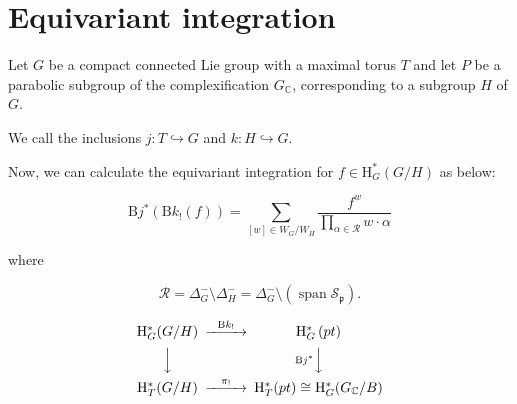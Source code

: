 \documentclass[uplatex,dvipdfmx]{jsarticle}
\begin{document}
\section{Equivariant integration}

Let 
$G$ 
be a compact connected Lie group with a maximal torus
$T$
and let
$P$
be a parabolic subgroup of the complexification 
$G_{\mathbb{C}}$,
corresponding to a subgroup
$H$
of
$G$.

We call the inclusions
$j \colon T \hookrightarrow G$
and
$k \colon H \hookrightarrow G$.

Now, we can calculate the equivariant integration for 
$f \in \mathrm{H}^*_G(G/H)$ 
as below:

\begin{equation}
    \mathrm{B}j^*\left( 
        \mathrm{B}k_! \left( 
            f
        \right)
    \right)
    =
    \sum_{
        [w] \in W_G / W_H
    }
    \frac{f^w}{\prod_{\alpha \in \mathcal{R}} w \cdot \alpha}
\end{equation}

where

\begin{equation}
    \mathcal{R}
    =
    \Delta_G^- \setminus \Delta_H^-
    =
    \Delta_G^- \setminus (\operatorname{span} \mathcal{S}_\mathfrak{p}).
\end{equation}

\begin{equation}
    \begin{CD}
        \mathrm{H}^*_G(G/H) @>{\mathrm{B}k_!}>> \mathrm{H}_G^*\left( pt \right) \\
        @VVV    @V{\mathrm{B}j^*}VV \\
        \mathrm{H}^*_T(G/H) @>{\pi_!}>> \mathrm{H}^*_T(pt) \cong \mathrm{H}^*_G(G_\mathbb{C}/B)
     \end{CD}
\end{equation}
\end{document}
